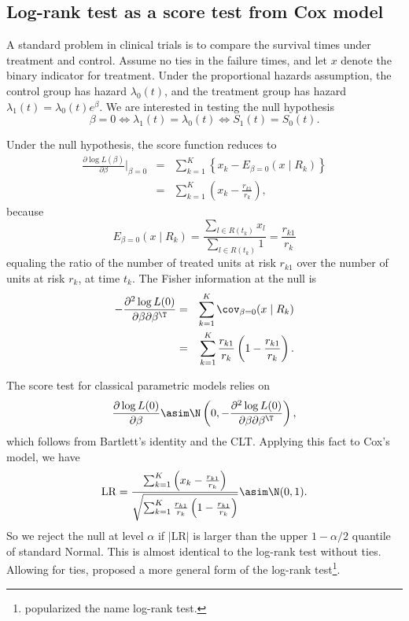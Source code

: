 \subsection{Log-rank test as a score test from Cox model}


A standard problem in clinical trials is to compare the survival times under treatment and control. Assume no ties in the failure times, and let $x$ denote the binary indicator for treatment. 
Under the proportional hazards assumption, the
control group has hazard $\lambda_{0}(t)$, and the treatment group has
hazard $\lambda_{1}(t) = \lambda_{0}(t)e^{\beta}.$ We are interested in testing the null hypothesis 
$$
\beta=0 \Longleftrightarrow \lambda_{1}(t) = \lambda_{0}(t) \Longleftrightarrow S_{1}(t) = S_{0}(t).
$$


Under the null hypothesis, the
score function reduces to
\begin{eqnarray*}
\frac{\partial\log L(\beta)}{\partial\beta}\Big|_{\beta=0} 
&=&\sum_{k=1}^{K}\left\{ x_{k}-E_{\beta=0}(x\mid R_{k})\right\} \\
&=&\sum_{k=1}^{K}\left(x_{k}-\frac{r_{k1}}{r_{k}}\right),
\end{eqnarray*}
because 
\[
E_{\beta=0}(x\mid R_{k})=\frac{\sum_{l\in R(t_{k})}x_{l}}{\sum_{l\in R(t_{k})}1}=\frac{r_{k1}}{r_{k}}
\]
equaling the ratio of the number of treated units at risk $r_{k1}$ over the
number of units at risk $r_k$, at time $t_k$. The Fisher information at the null is
\begin{eqnarray*}
-\frac{\partial^{2}\log L( 0 )}{\partial\beta\partial\beta^{\T}} 
&=& \sum_{k=1}^{K}\cov_{\beta=0}(x\mid R_{k}) \\
&=& \sum_{k=1}^{K}\frac{r_{k1}}{r_{k}}\left(1-\frac{r_{k1}}{r_{k}}\right).
\end{eqnarray*}

The score test for classical parametric models relies on  
$$
\frac{\partial\log L( 0 )}{\partial\beta}  \asim \N \left(0,  -\frac{\partial^{2}\log L( 0 )}{\partial\beta\partial\beta^{\T}}   \right),
$$
which follows from Bartlett's identity and the CLT. Applying this fact to Cox's model, we have
\[
\text{LR} = \frac{\sum_{k=1}^{K}\left(x_{k}-\frac{r_{k1}}{r_{k}}\right)}{\sqrt{\sum_{k=1}^{K}\frac{r_{k1}}{r_{k}}\left(1-\frac{r_{k1}}{r_{k}}\right)}}\asim\N(0,1).
\]
So we reject the null at level $\alpha$ if $|\text{LR} | $ is larger than the upper $1-\alpha/2$ quantile of standard Normal. This
is almost identical to the log-rank test without ties. Allowing for ties, \citet{mantel1966evaluation} proposed a more general form of the log-rank test\footnote{\citet{peto1972asymptotically} popularized the name log-rank test.}.



